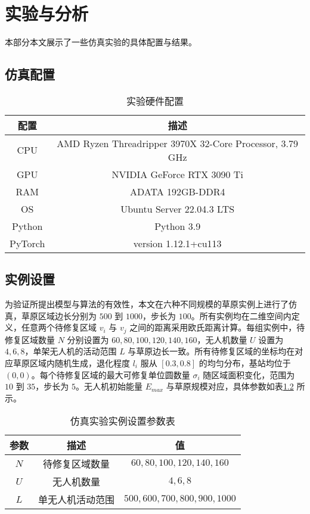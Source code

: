 \documentclass[AutoFakeBold]{LZUThesis}
\begin{document}
\chapter{实验与分析}
本部分本文展示了一些仿真实验的具体配置与结果。
\label{sub:实验配置表格}
\section{仿真配置}
\begin{table}[H]
	\centering
	\caption{实验硬件配置}
	\begin{tabular}{cc} %
		\toprule
		配置      & 描述                                                       \\
		\midrule
		CPU     & AMD Ryzen Threadripper 3970X 32-Core Processor, 3.79 GHz \\
		GPU     & NVIDIA GeForce RTX 3090 Ti                               \\
		RAM     & ADATA 192GB-DDR4                                         \\
		OS      & Ubuntu Server 22.04.3 LTS                                \\
		Python  & Python 3.9                                               \\
		PyTorch & version 1.12.1+cu113                                     \\
		\bottomrule
	\end{tabular}
	\label{tbl_hardware_config}
\end{table}
\section{实例设置}
为验证所提出模型与算法的有效性，本文在六种不同规模的草原实例上进行了仿真，草原区域边长分别为 $500$ 到 $1000$，步长为 $100$。所有实例均在二维空间内定义，任意两个待修复区域 $v_i$ 与 $v_j$ 之间的距离采用欧氏距离计算。每组实例中，待修复区域数量 $N$ 分别设置为 $60, 80, 100, 120, 140, 160$，无人机数量 $U$ 设置为 $4, 6, 8$，单架无人机的活动范围 $L$ 与草原边长一致。所有待修复区域的坐标均在对应草原区域内随机生成，退化程度 $l_i$ 服从 $[0.3, 0.8]$ 的均匀分布，基站均位于 $(0,0)$。每个待修复区域的最大可修复单位圆数量 $\sigma_i$ 随区域面积变化，范围为 $10$ 到 $35$，步长为 $5$。无人机初始能量 $E_{max}$ 与草原规模对应，具体参数如表\ref{tbl_instance_setting} 所示。

\begin{table}[H]
	\centering
	\caption{仿真实验实例设置参数表}
	\setlength{\tabcolsep}{18pt} %
	\begin{tabular}{ccc}
		\toprule
		参数  & 描述       & 值                               \\
		\midrule
		$N$ & 待修复区域数量  & $60, 80, 100, 120, 140, 160$    \\
		$U$ & 无人机数量    & $4, 6, 8$                       \\
		$L$ & 单无人机活动范围 & $500, 600, 700, 800, 900, 1000$ \\
		\bottomrule
	\end{tabular}
	\label{tbl_instance_setting}
\end{table}
\end{document}
